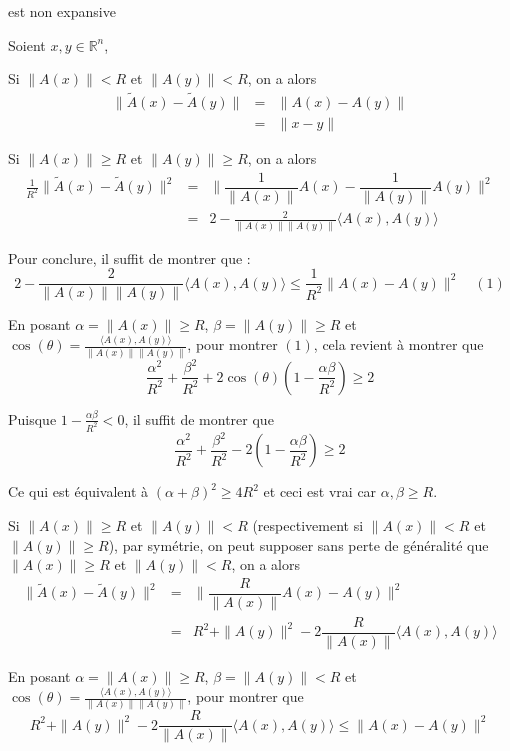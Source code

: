 est non expansive

Soient $x, y \in \mathbb{R}^n$,

Si $\|A (x)\|< R$ et $\|A (y)\|< R$, on a alors
\begin{eqnarray*}
  \| \tilde{A} (x) - \tilde{A} (y)\| & = & \|A (x) - A (y) \|\\
  & = & \|x - y\|
\end{eqnarray*}


 Si $\|A (x)\| \geq R$ et $\|A (y)\| \geq R$, on a alors
\begin{eqnarray*}
  \frac{1}{R^2} \| \tilde{A} (x) - \tilde{A} (y)\|^2 & = & \| \dfrac{1}{\|A
  (x)\|} A (x) - \dfrac{1}{\|A (y)\|} A (y) \|^2\\
  & = & 2 - \frac{2}{\|A (x)\|\|A (y)\|} \langle A (x), A (y) \rangle \qquad
\end{eqnarray*}


Pour conclure, il suffit de montrer que :
\[ 2 - \frac{2}{\|A (x)\|\|A (y)\|} \langle A (x), A (y) \rangle \leqslant
   \frac{1}{R^2} \|A (x) - A (y)\|^2 \quad (1) \]


En posant $\alpha =\|A (x)\| \geq R$, $\beta =\|A (y)\| \geq R$ et $\cos
(\theta) = \frac{\langle A (x), A (y) \rangle}{\|A (x)\|\|A (y)\|}$, pour
montrer $(1)$, cela revient {\`a} montrer que
\[ \frac{\alpha^2}{R^2} + \frac{\beta^2}{R^2} + 2 \cos (\theta) \left( 1 -
   \frac{\alpha \beta}{R^2} \right) \geqslant 2 \]


Puisque $1 - \frac{\alpha \beta}{R^2} < 0$, il suffit de montrer que
\[ \frac{\alpha^2}{R^2} + \frac{\beta^2}{R^2} - 2 \left( 1 - \frac{\alpha
   \beta}{R^2} \right) \geqslant 2 \]


Ce qui est {\'e}quivalent {\`a} $(\alpha + \beta)^2 \geqslant 4 R^2$ et ceci
est vrai car $\alpha, \beta \geqslant R$.

 Si $\|A (x)\| \geq R$ et $\|A (y)\|< R$ (respectivement si
$\|A (x)\|< R$ et $\|A (y)\| \geqslant R$), par sym{\'e}trie, on peut supposer
sans perte de g{\'e}n{\'e}ralit{\'e} que $\|A (x)\| \geq R$ et $\|A (y)\|< R$,
on a alors
\begin{eqnarray*}
  \| \tilde{A} (x) - \tilde{A} (y)\|^2 & = & \| \dfrac{R}{\|A (x)\|} A (x) - A
  (y)\|^2\\
  & = & R^2 +\|A (y)\|^2 - 2 \dfrac{R}{\|A (x)\|}  \langle A (x), A (y)
  \rangle
\end{eqnarray*}


En posant $\alpha =\|A (x)\| \geq R$, $\beta =\|A (y)\|< R$ et $\cos (\theta)
= \frac{\langle A (x), A (y) \rangle}{\|A (x)\|\|A (y)\|}$, pour montrer que
\[ R^2 +\|A (y)\|^2 - 2 \dfrac{R}{\|A (x)\|}  \langle A (x), A (y) \rangle
   \leqslant \|A (x) - A (y) \|^2 \]


